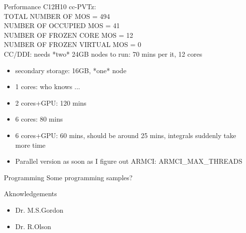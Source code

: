 \documentclass{beamer}
\begin{document}
\begin{frame}{Performance}
  C12H10 cc-PVTz:  \\
  TOTAL NUMBER OF MOS          =   494\\
  NUMBER OF OCCUPIED MOS       =    41\\
  NUMBER OF FROZEN CORE MOS    =    12\\
  NUMBER OF FROZEN VIRTUAL MOS =     0\\
  CC/DDI: needs *two* 24GB nodes to run:  70 mins per it, 12 cores
  \begin{itemize}
  \item secondary storage: 16GB, *one* node
  \item 1 cores:  who knows ...
  \item 2 cores+GPU: 120 mins
  \item 6 cores: 80 mins
  \item 6 cores+GPU: 60 mins, should be around 25 mins,  integrals
    suddenly take more time
  \item Parallel version as soon as I figure out ARMCI:  ARMCI\_MAX\_THREADS
  \end{itemize}
\end{frame}

\begin{frame}{Programming}
  Some programming samples?
\end{frame}

 
\begin{frame}{Aknowledgements}
  \begin{itemize}
  \item Dr. M.S.Gordon
  \item Dr. R.Olson 
  \end{itemize}
\end{frame}
\end{document}
